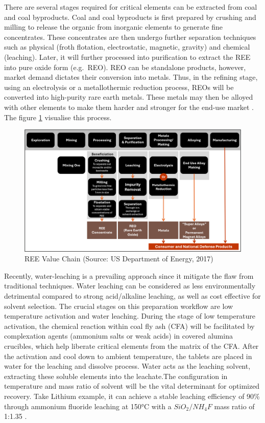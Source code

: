\documentclass[11pt,a4paper,]{article}
\begin{document}
There are several stages required for critical elements can be extracted from coal and coal byproducts. Coal and coal byproducts is first prepared by crushing and milling to release the organic from inorganic elements to generate fine concentrates. These concentrates are then undergo further separation techniques such as physical (froth flotation, electrostatic, magnetic, gravity) and chemical (leaching). Later, it will further processed into purification to extract the REE into pure oxide form (e.g.~REO). REO can be standalone products, however, market demand dictates their conversion into metals. Thus, in the refining stage, using an electrolysis or a metallothermic reduction process, REOs will be converted into high-purity rare earth metals. These metals may then be alloyed with other elements to make them harder and stronger for the end-use market \autocite{Eterigho2021,usde2017,TALAN2022107897}. The figure \ref{fig:ree-vc} visualise this process.

\begin{figure}

{\centering \includegraphics[width=1\linewidth]{Final_report_files/figure-latex/Critical_Mineral_Extraction_Process_v2} 

}

\caption{REE Value Chain (Source: US Department of Energy, 2017)}\label{fig:ree-vc}
\end{figure}

Recently, water-leaching is a prevailing approach since it mitigate the flaw from traditional techniques. Water leaching can be considered as less environmentally detrimental compared to strong acid/alkaline leaching, as well as cost effective for solvent selection. The crucial stages on this preparation workflow are low temperature activation and water leaching. During the stage of low temperature activation, the chemical reaction within coal fly ash (CFA) will be facilitated by complexation agents (ammonium salts or weak acids) in covered alumina crucibles, which help liberate critical elements from the matrix of the CFA. After the activation and cool down to ambient temperature, the tablets are placed in water for the leaching and dissolve process. Water acts as the leaching solvent, extracting these soluble elements into the leachate.The configuration in temperature and mass ratio of solvent will be the vital determinant for optimized recovery. Take Lithium example, it can achieve a stable leaching efficiency of 90\% through ammonium fluoride leaching at 150°C with a \(SiO_2/NH_4F\) mass ratio of 1:1.35 \textcite{Xu2021}.
\end{document}
